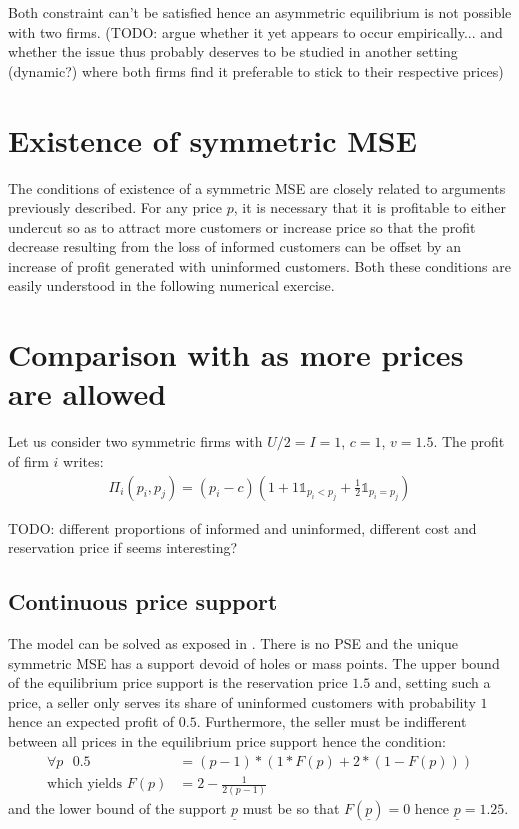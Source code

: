 \documentclass[11pt]{article}
\begin{document}
Both constraint can't be satisfied hence an asymmetric equilibrium is not possible with two firms. (TODO: argue whether it yet appears to occur empirically... and whether the issue thus probably deserves to be studied in another setting (dynamic?) where both firms find it preferable to stick to their respective prices)

\section{Existence of symmetric MSE}

The conditions of existence of a symmetric MSE are closely related to arguments previously described. For any price $p$, it is necessary that it is profitable to either undercut so as to attract more customers or increase price so that the profit decrease resulting from the loss of informed customers can be offset by an increase of profit generated with uninformed customers. Both these conditions are easily understood in the following numerical exercise.

\section{Comparison with \cite{VAR80} as more prices are allowed}

Let us consider two symmetric firms with $U/2 = I = 1$, $c=1$, $v=1.5$. The profit of firm $i$ writes:
\begin{align*}
\Pi_i(p_i, p_j) = (p_i - c) (1 + 1 \mathbb{1}_{p_i < p_j} + \frac{1}{2} \mathbb{1}_{p_i = p_j})
\end{align*}

TODO: different proportions of informed and uninformed, different cost and reservation price if seems interesting?

\subsection{Continuous price support}

The model can be solved as exposed in \cite{VAR80}. There is no PSE and the unique symmetric MSE has a support devoid of holes or mass points. The upper bound of the equilibrium price support is the reservation price $1.5$ and, setting such a price, a seller only serves its share of uninformed customers with probability $1$ hence an expected profit of $0.5$. Furthermore, the seller must be indifferent between all prices in the equilibrium price support hence the condition:
\begin{align*}
\forall p \text{ } 0.5 & = (p-1) * (1*F(p) + 2*(1-F(p))) \\
\text{which yields } F(p) & = 2 - \frac{1}{2(p-1)}
\end{align*}
and the lower bound of the support $\underline{p}$ must be so that $F(\underline{p})=0$ hence $\underline{p}=1.25$.
\end{document}
